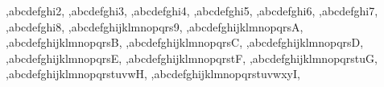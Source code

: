 {{\QRdataadd,abcdefghi2,%
\QRdataadd,abcdefghi3,%
\QRdataadd,abcdefghi4,%
\QRdataadd,abcdefghi5,%
\QRdataadd,abcdefghi6,%
\QRdataadd,abcdefghi7,%
\QRdataadd,abcdefghi8,%
\QRdataadd,abcdefghijklmnopqrs9,%
\QRdataadd,abcdefghijklmnopqrsA,%
\QRdataadd,abcdefghijklmnopqrsB,%
\QRdataadd,abcdefghijklmnopqrsC,%
\QRdataadd,abcdefghijklmnopqrsD,%
\QRdataadd,abcdefghijklmnopqrsE,%
\QRdataadd,abcdefghijklmnopqrstF,%
\QRdataadd,abcdefghijklmnopqrstuG,%
\QRdataadd,abcdefghijklmnopqrstuvwH,%
\QRdataadd,abcdefghijklmnopqrstuvwxyI,%
}}
